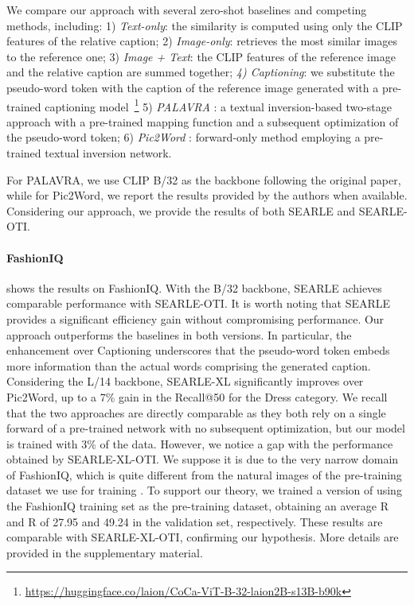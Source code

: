\documentclass[10pt,twocolumn,letterpaper]{article}
\newcommand{\method}{SEARLE\xspace}
\begin{document}
We compare our approach with several zero-shot baselines and competing methods, including: 1) \textit{Text-only}: the similarity is computed using only the CLIP features of the relative caption; 2) \textit{Image-only}: retrieves the most similar images to the reference one; 3) \textit{Image + Text}: the CLIP features of the reference image and the relative caption are summed together; \textit{4) Captioning}: we substitute the pseudo-word token with the caption of the reference image generated with a pre-trained captioning model~\cite{yu2022coca}\footnote{\href{https://huggingface.co/laion/CoCa-ViT-B-32-laion2B-s13B-b90k}{https://huggingface.co/laion/CoCa-ViT-B-32-laion2B-s13B-b90k}}
5) \textit{PALAVRA} \cite{cohen2022this}: a textual inversion-based two-stage approach with a pre-trained mapping function and a subsequent optimization of the pseudo-word token; 6) \textit{Pic2Word} \cite{saito2023pic2word}: forward-only method employing a pre-trained textual inversion network.

For PALAVRA, we use CLIP B/32 as the backbone following the original paper, while for Pic2Word, we report the results provided by the authors when available.
Considering our approach, we provide the results of both \method and \method-OTI.

\paragraph{FashionIQ}
 shows the results on FashionIQ. With the B/32 backbone, \method achieves comparable performance with \method-OTI. It is worth noting that \method provides a significant efficiency gain without compromising performance. Our approach outperforms the baselines in both versions. In particular, the enhancement over Captioning underscores
that the pseudo-word token embeds more information than the actual words comprising the generated caption. Considering the L/14 backbone, \method-XL significantly improves over Pic2Word, up to a 7\% gain in the Recall@50 for the Dress category. We recall that the two approaches are directly comparable as they both rely on a single forward of a pre-trained network with no subsequent optimization, but our model is trained with 3\% of the data. However, we notice a gap with the performance obtained by \method-XL-OTI. We suppose it is due to the very narrow domain of FashionIQ, which is quite different from the natural images of the pre-training dataset we use for training . To support our theory, we trained a version of  using the FashionIQ training set as the pre-training dataset, obtaining an average R and R of 27.95 and 49.24 in the validation set, respectively. These results are comparable with \method-XL-OTI, confirming our hypothesis. More details are provided in the supplementary material.
\end{document}
